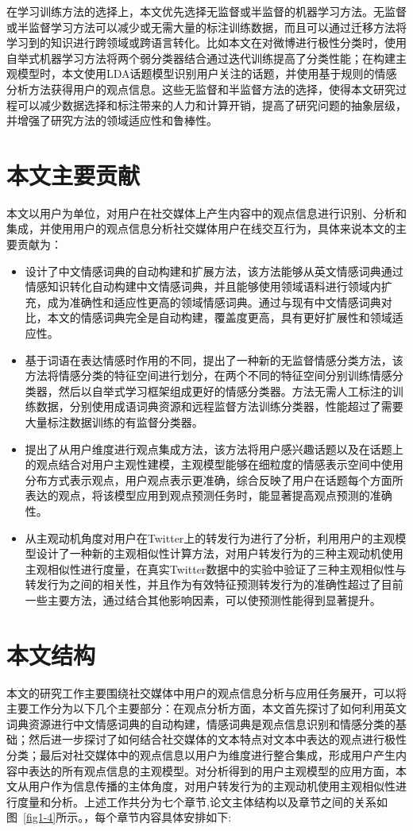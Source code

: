 在学习训练方法的选择上，本文优先选择无监督或半监督的机器学习方法。无监督或半监督学习方法可以减少或无需大量的标注训练数据，而且可以通过迁移方法将学习到的知识进行跨领域或跨语言转化。比如本文在对微博进行极性分类时，使用自举式机器学习方法将两个弱分类器结合通过迭代训练提高了分类性能；在构建主观模型时，本文使用LDA话题模型识别用户关注的话题，并使用基于规则的情感分析方法获得用户的观点信息。这些无监督和半监督方法的选择，使得本文研究过程可以减少数据选择和标注带来的人力和计算开销，提高了研究问题的抽象层级，并增强了研究方法的领域适应性和鲁棒性。

\section{本文主要贡献}
本文以用户为单位，对用户在社交媒体上产生内容中的观点信息进行识别、分析和集成，并使用用户的观点信息分析社交媒体用户在线交互行为，具体来说本文的主要贡献为：
\begin{itemize}
\item 设计了中文情感词典的自动构建和扩展方法，该方法能够从英文情感词典通过情感知识转化自动构建中文情感词典，并且能够使用领域语料进行领域内扩充，成为准确性和适应性更高的领域情感词典。通过与现有中文情感词典对比，本文的情感词典完全是自动构建，覆盖度更高，具有更好扩展性和领域适应性。
\item 基于词语在表达情感时作用的不同，提出了一种新的无监督情感分类方法，该方法将情感分类的特征空间进行划分，在两个不同的特征空间分别训练情感分类器，然后以自举式学习框架组成更好的情感分类器。方法无需人工标注的训练数据，分别使用成语词典资源和远程监督方法训练分类器，性能超过了需要大量标注数据训练的有监督分类器。
\item 提出了从用户维度进行观点集成方法，该方法将用户感兴趣话题以及在话题上的观点结合对用户主观性建模，主观模型能够在细粒度的情感表示空间中使用分布方式表示观点，用户观点表示更准确，综合反映了用户在话题每个方面所表达的观点，将该模型应用到观点预测任务时，能显著提高观点预测的准确性。
\item 从主观动机角度对用户在Twitter上的转发行为进行了分析，利用用户的主观模型设计了一种新的主观相似性计算方法，对用户转发行为的三种主观动机使用主观相似性进行度量，在真实Twitter数据中的实验中验证了三种主观相似性与转发行为之间的相关性，并且作为有效特征预测转发行为的准确性超过了目前一些主要方法，通过结合其他影响因素，可以使预测性能得到显著提升。
\end{itemize}

\section{本文结构}
本文的研究工作主要围绕社交媒体中用户的观点信息分析与应用任务展开，可以将主要工作分为以下几个主要部分：在观点分析方面，本文首先探讨了如何利用英文词典资源进行中文情感词典的自动构建，情感词典是观点信息识别和情感分类的基础；然后进一步探讨了如何结合社交媒体的文本特点对文本中表达的观点进行极性分类；最后对社交媒体中的观点信息以用户为维度进行整合集成，形成用户产生内容中表达的所有观点信息的主观模型。对分析得到的用户主观模型的应用方面，本文从用户作为信息传播的主体角度，对用户转发行为的主观动机使用主观相似性进行度量和分析。上述工作共分为七个章节,论文主体结构以及章节之间的关系如图~\ref{fig1-4}所示。，每个章节内容具体安排如下:

